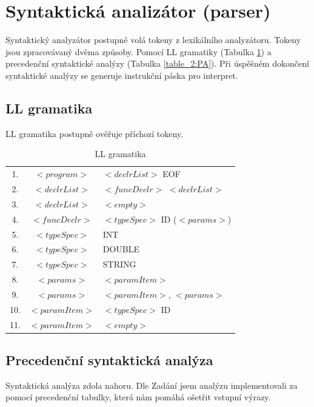 \documentclass[a4paper, 11pt, titlepage]{article}
\begin{document}
\newpage
\section{Syntaktická analizátor (parser)}
Syntaktický analyzátor postupně volá tokeny z lexikálního analyzátoru. Tokeny jsou zpracovávaný dvěma způsoby. Pomocí LL gramatiky (Tabulka \ref{table_1:LL_gramatic}) a precedenční syntaktické analýzy (Tabulka \ref{table_2:PA}). Při úspěšném dokončení syntaktické analýzy se generuje instrukční páska pro interpret.

\subsection{LL gramatika}
LL gramatika postupně ověřuje příchozí tokeny.   

\begin{table}[h]
\footnotesize
	\begin{center}
	\begin{tabular}{c c l}
	1.  & $<program>$ 	 & 	$<declrList>$ EOF \\ 
	2.  & $<declrList>$  &  $<funcDeclr>$ $<declrList>$ \\ 
	3.  & $<declrList>$  &  $<empty>$ \\ 
	4.  & $<funcDeclr>$  &  $<typeSpec>$ ID ($<params>$) \\
	5.  & $<typeSpec>$ 	 &  INT \\
	6.  & $<typeSpec>$   &  DOUBLE \\ 
	7.  & $<typeSpec>$ 	 &  STRING \\ 
	8.  & $<params>$ 	 & 	$<paramItem>$ \\ 
	9.  & $<params>$ 	 & 	$<paramItem>$, $<params>$ \\ 
	10. & $<paramItem>$  & 	$<typeSpec>$ ID\\ 
	11. & $<paramItem>$  & 	$<empty>$ \\ 
	\end{tabular}
	\caption{LL gramatika}
	\label{table_1:LL_gramatic}
	\end{center}
\end{table}

\subsection{Precedenční syntaktická analýza}
Syntaktická analýza zdola nahoru. Dle Zadání jsem analýzu implementovali za pomocí precedenční tabulky, která nám pomáhá ošetřit vstupní výrazy.
\end{document}
